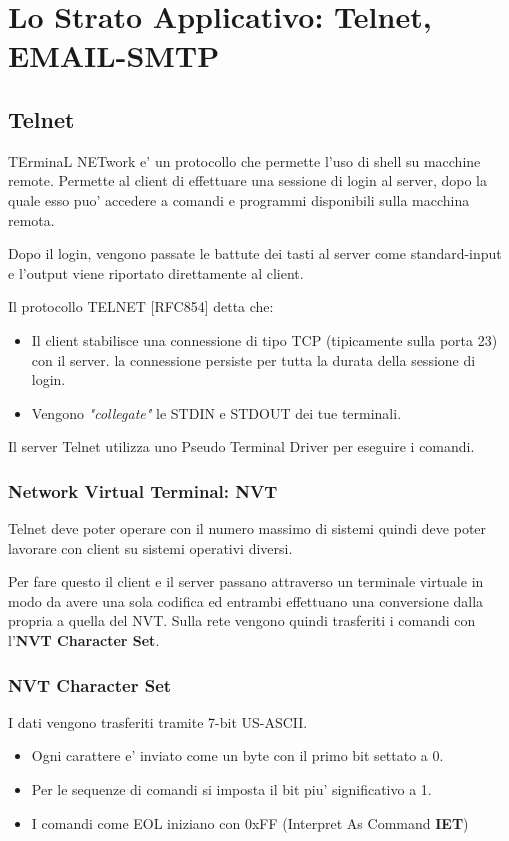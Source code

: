\chapter{Lo Strato Applicativo: Telnet, EMAIL-SMTP}
\section{Telnet}
TErminaL NETwork e' un protocollo che permette l'uso di shell su macchine remote.
Permette al client di effettuare una sessione di login al server, dopo la quale esso puo' accedere a comandi e programmi disponibili sulla macchina remota.

Dopo il login, vengono passate le battute dei tasti al server come standard-input e l'output viene riportato direttamente al client.

Il protocollo TELNET [RFC854] detta che:
\begin{itemize}
    \item Il client stabilisce una connessione di tipo TCP (tipicamente sulla porta 23) con il server. la connessione persiste per tutta la durata della sessione di login.
    \item Vengono \textit{"collegate"} le STDIN e STDOUT dei tue terminali.
\end{itemize}
Il server Telnet utilizza uno Pseudo Terminal Driver per eseguire i comandi.
\subsection{Network Virtual Terminal: NVT}
Telnet deve poter operare con il numero massimo di sistemi quindi deve poter lavorare con client su sistemi operativi diversi.

Per fare questo il client e il server passano attraverso un terminale virtuale in modo da avere una sola codifica ed entrambi effettuano una conversione dalla propria a quella del NVT.
Sulla rete vengono quindi trasferiti i comandi con l'\textbf{NVT Character Set}.
\newpage
\subsection{NVT Character Set}
I dati vengono trasferiti tramite 7-bit US-ASCII.
\begin{itemize}
    \item Ogni carattere e' inviato come un byte con il primo bit settato a 0.
    \item Per le sequenze di comandi si imposta il bit piu' significativo a 1.
    \item I comandi come EOL iniziano con 0xFF (Interpret As Command \textbf{IET})
\end{itemize}
